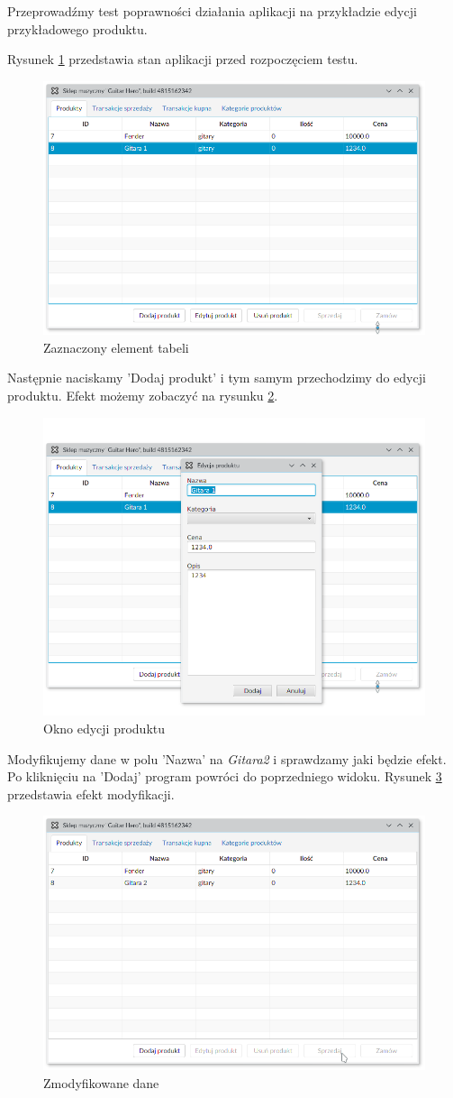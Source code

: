 Przeprowadźmy test poprawności działania aplikacji na przykładzie edycji przykładowego produktu.

Rysunek \ref{image8} przedstawia stan aplikacji przed rozpoczęciem testu.

\newpage
\begin{figure}[h]
	\centering
	\includegraphics[width=0.6\linewidth]{images/image8.png}
	\caption{Zaznaczony element tabeli}
	\label{image8}
\end{figure}

Następnie naciskamy 'Dodaj produkt' i tym samym przechodzimy do edycji produktu. Efekt możemy zobaczyć na rysunku \ref{image9}.

\begin{figure}[h]
	\centering
	\includegraphics[width=0.5\linewidth]{images/image9.png}
	\caption{Okno edycji produktu}
	\label{image9}
\end{figure}

Modyfikujemy dane w polu 'Nazwa' na \emph{Gitara2} i sprawdzamy jaki będzie efekt. Po kliknięciu na 'Dodaj' program powróci do poprzedniego widoku. Rysunek \ref{image10} przedstawia efekt modyfikacji.

\newpage
\begin{figure}[h]
	\centering
	\includegraphics[width=0.7\linewidth]{images/image10.png}
	\caption{Zmodyfikowane dane}
	\label{image10}
\end{figure}

